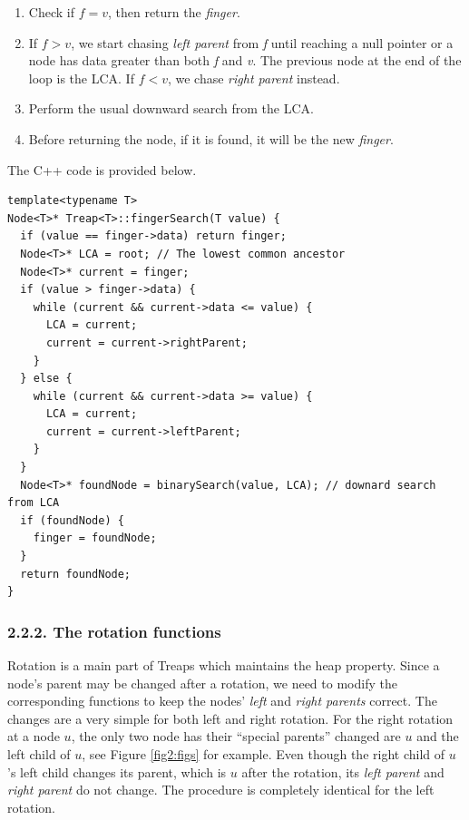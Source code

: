 \documentclass[12pt,english,]{article}
\providecommand{\tightlist}{%
  \setlength{\itemsep}{0pt}\setlength{\parskip}{0pt}}
\begin{document}
\begin{enumerate}
\def\labelenumi{\arabic{enumi}.}
\tightlist
\item
  Check if \(f = v\), then return the \emph{finger}.
\item
  If \(f > v\), we start chasing \emph{left parent} from \emph{f} until
  reaching a null pointer or a node has data greater than both \emph{f}
  and \emph{v}. The previous node at the end of the loop is the LCA. If
  \(f < v\), we chase \emph{right parent} instead.
\item
  Perform the usual downward search from the LCA.
\item
  Before returning the node, if it is found, it will be the new
  \emph{finger}. \vspace{-4mm}
\end{enumerate}

The C++ code is provided below.

\begin{lstlisting}
template<typename T>
Node<T>* Treap<T>::fingerSearch(T value) {
  if (value == finger->data) return finger;
  Node<T>* LCA = root; // The lowest common ancestor
  Node<T>* current = finger;
  if (value > finger->data) {
    while (current && current->data <= value) {
      LCA = current;
      current = current->rightParent;
    }
  } else {
    while (current && current->data >= value) {
      LCA = current;
      current = current->leftParent;
    }
  }
  Node<T>* foundNode = binarySearch(value, LCA); // downard search from LCA
  if (foundNode) {
    finger = foundNode;
  }
  return foundNode;
}
\end{lstlisting}

\vspace{-7mm}

\hypertarget{the-rotation-functions}{%
\subsubsection{2.2.2. The rotation
functions}\label{the-rotation-functions}}

Rotation is a main part of Treaps which maintains the heap property.
Since a node's parent may be changed after a rotation, we need to modify
the corresponding functions to keep the nodes' \emph{left} and
\emph{right parents} correct. The changes are a very simple for both
left and right rotation. For the right rotation at a node \(u\), the
only two node has their ``special parents'' changed are \(u\) and the
left child of \(u\), see Figure \ref{fig2:figs} for example. Even though
the right child of \(u\)'s left child changes its parent, which is \(u\)
after the rotation, its \emph{left parent} and \emph{right parent} do
not change. The procedure is completely identical for the left rotation.
\end{document}
